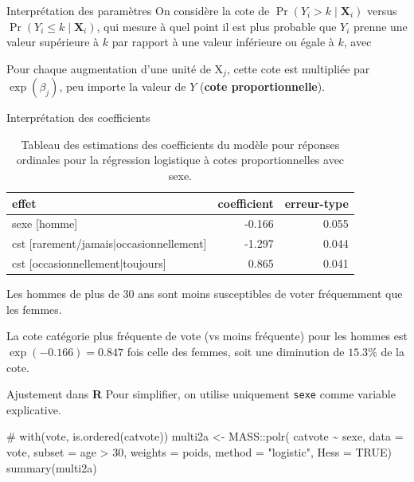 \documentclass[
  ignorenonframetext,
]{beamer}
\newenvironment{Shaded}{\begin{snugshade}}{\end{snugshade}}
\newcommand{\AttributeTok}[1]{\textcolor[rgb]{0.40,0.45,0.13}{#1}}
\newcommand{\CommentTok}[1]{\textcolor[rgb]{0.37,0.37,0.37}{#1}}
\newcommand{\ConstantTok}[1]{\textcolor[rgb]{0.56,0.35,0.01}{#1}}
\newcommand{\DecValTok}[1]{\textcolor[rgb]{0.68,0.00,0.00}{#1}}
\newcommand{\FunctionTok}[1]{\textcolor[rgb]{0.28,0.35,0.67}{#1}}
\newcommand{\NormalTok}[1]{\textcolor[rgb]{0.00,0.23,0.31}{#1}}
\newcommand{\OtherTok}[1]{\textcolor[rgb]{0.00,0.23,0.31}{#1}}
\newcommand{\SpecialCharTok}[1]{\textcolor[rgb]{0.37,0.37,0.37}{#1}}
\newcommand{\StringTok}[1]{\textcolor[rgb]{0.13,0.47,0.30}{#1}}
\begin{document}
\begin{frame}{Interprétation des paramètres}
\protect\hypertarget{interpruxe9tation-des-paramuxe8tres}{}
On considère la cote de \(\Pr(Y_i> k\mid \mathbf{X}_i)\) versus
\(\Pr(Y_i \le k\mid \mathbf{X}_i)\), qui mesure à quel point il est plus
probable que \(Y_i\) prenne une valeur supérieure à \(k\) par rapport à
une valeur inférieure ou égale à \(k\), avec

Pour chaque augmentation d'une unité de \(\mathrm{X}_j\), cette cote est
multipliée par \(\exp(\beta_j)\), peu importe la valeur de \(Y\)
(\textbf{cote proportionnelle}).
\end{frame}

\begin{frame}{Interprétation des coefficients}
\protect\hypertarget{interpruxe9tation-des-coefficients}{}
\hypertarget{tbl-ordered-logistic}{}
\begin{table}
\caption{\label{tbl-ordered-logistic}Tableau des estimations des coefficients du modèle pour réponses
ordinales pour la régression logistique à cotes proportionnelles avec
sexe. }\tabularnewline

\centering
\begin{tabular}[t]{lrr}
\toprule
effet & coefficient & erreur-type\\
\midrule
sexe [homme] & -0.166 & 0.055\\
cst [rarement/jamais|occasionnellement] & -1.297 & 0.044\\
cst [occasionnellement|toujours] & 0.865 & 0.041\\
\bottomrule
\end{tabular}
\end{table}

Les hommes de plus de 30 ans sont moins susceptibles de voter
fréquemment que les femmes.

La cote catégorie plus fréquente de vote (vs moins fréquente) pour les
hommes est \(\exp(-0.166)=0.847\) fois celle des femmes, soit une
diminution de \(15.3\%\) de la cote.
\end{frame}

\begin{frame}[fragile]{Ajustement dans \textbf{R}}
\protect\hypertarget{ajustement-dans-r}{}
Pour simplifier, on utilise uniquement \texttt{sexe} comme variable
explicative.

\begin{Shaded}
\begin{Highlighting}[numbers=left,,]
\CommentTok{\# with(vote, is.ordered(catvote))}
\NormalTok{multi2a }\OtherTok{\textless{}{-}}\NormalTok{ MASS}\SpecialCharTok{::}\FunctionTok{polr}\NormalTok{(}
\NormalTok{  catvote }\SpecialCharTok{\textasciitilde{}}\NormalTok{ sexe, }
  \AttributeTok{data =}\NormalTok{ vote, }
  \AttributeTok{subset =}\NormalTok{ age }\SpecialCharTok{\textgreater{}} \DecValTok{30}\NormalTok{,}
  \AttributeTok{weights =}\NormalTok{ poids,}
  \AttributeTok{method =} \StringTok{"logistic"}\NormalTok{, }
  \AttributeTok{Hess =} \ConstantTok{TRUE}\NormalTok{)}
\FunctionTok{summary}\NormalTok{(multi2a)}
\end{Highlighting}
\end{Shaded}
\end{frame}
\end{document}
